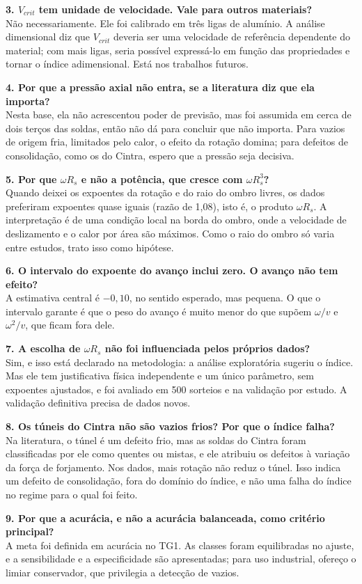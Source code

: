 \documentclass[11pt,a4paper]{article}
\begin{document}
\textbf{3. $V_{crit}$ tem unidade de velocidade. Vale para outros materiais?}\\
Não necessariamente. Ele foi calibrado em três ligas de alumínio. A análise dimensional diz que $V_{crit}$ deveria ser uma velocidade de referência dependente do material; com mais ligas, seria possível expressá-lo em função das propriedades e tornar o índice adimensional. Está nos trabalhos futuros.

\textbf{4. Por que a pressão axial não entra, se a literatura diz que ela importa?}\\
Nesta base, ela não acrescentou poder de previsão, mas foi assumida em cerca de dois terços das soldas, então não dá para concluir que não importa. Para vazios de origem fria, limitados pelo calor, o efeito da rotação domina; para defeitos de consolidação, como os do Cintra, espero que a pressão seja decisiva.

\textbf{5. Por que $\omega R_s$ e não a potência, que cresce com $\omega R_s^{3}$?}\\
Quando deixei os expoentes da rotação e do raio do ombro livres, os dados preferiram expoentes quase iguais (razão de 1,08), isto é, o produto $\omega R_s$. A interpretação é de uma condição local na borda do ombro, onde a velocidade de deslizamento e o calor por área são máximos. Como o raio do ombro só varia entre estudos, trato isso como hipótese.

\textbf{6. O intervalo do expoente do avanço inclui zero. O avanço não tem efeito?}\\
A estimativa central é $-0{,}10$, no sentido esperado, mas pequena. O que o intervalo garante é que o peso do avanço é muito menor do que supõem $\omega/v$ e $\omega^{2}/v$, que ficam fora dele.

\textbf{7. A escolha de $\omega R_s$ não foi influenciada pelos próprios dados?}\\
Sim, e isso está declarado na metodologia: a análise exploratória sugeriu o índice. Mas ele tem justificativa física independente e um único parâmetro, sem expoentes ajustados, e foi avaliado em 500 sorteios e na validação por estudo. A validação definitiva precisa de dados novos.

\textbf{8. Os túneis do Cintra não são vazios frios? Por que o índice falha?}\\
Na literatura, o túnel é um defeito frio, mas as soldas do Cintra foram classificadas por ele como quentes ou mistas, e ele atribuiu os defeitos à variação da força de forjamento. Nos dados, mais rotação não reduz o túnel. Isso indica um defeito de consolidação, fora do domínio do índice, e não uma falha do índice no regime para o qual foi feito.

\textbf{9. Por que a acurácia, e não a acurácia balanceada, como critério principal?}\\
A meta foi definida em acurácia no TG1. As classes foram equilibradas no ajuste, e a sensibilidade e a especificidade são apresentadas; para uso industrial, ofereço o limiar conservador, que privilegia a detecção de vazios.
\end{document}
